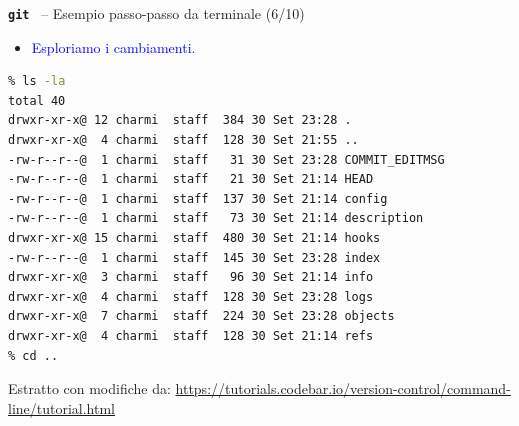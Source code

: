 \documentclass{beamer}
\newcommand{\git}{\texttt{\textbf{git}}\xspace}
\begin{document}
\begin{frame}[fragile]{\centerline{\git ~ -- Esempio passo-passo da terminale (6/10)}}
\begin{itemize}
\item \textcolor{blue}{Esploriamo i cambiamenti.}
\end{itemize}
\begin{lstlisting}[language=sh]
% cd .git
% ls -la
total 40
drwxr-xr-x@ 12 charmi  staff  384 30 Set 23:28 .
drwxr-xr-x@  4 charmi  staff  128 30 Set 21:55 ..
-rw-r--r--@  1 charmi  staff   31 30 Set 23:28 COMMIT_EDITMSG
-rw-r--r--@  1 charmi  staff   21 30 Set 21:14 HEAD
-rw-r--r--@  1 charmi  staff  137 30 Set 21:14 config
-rw-r--r--@  1 charmi  staff   73 30 Set 21:14 description
drwxr-xr-x@ 15 charmi  staff  480 30 Set 21:14 hooks
-rw-r--r--@  1 charmi  staff  145 30 Set 23:28 index
drwxr-xr-x@  3 charmi  staff   96 30 Set 21:14 info
drwxr-xr-x@  4 charmi  staff  128 30 Set 23:28 logs
drwxr-xr-x@  7 charmi  staff  224 30 Set 23:28 objects
drwxr-xr-x@  4 charmi  staff  128 30 Set 21:14 refs
% cd ..
\end{lstlisting}

\begin{center}
    \tiny Estratto con modifiche da: \url{https://tutorials.codebar.io/version-control/command-line/tutorial.html}
\end{center}
\end{frame}
\end{document}
